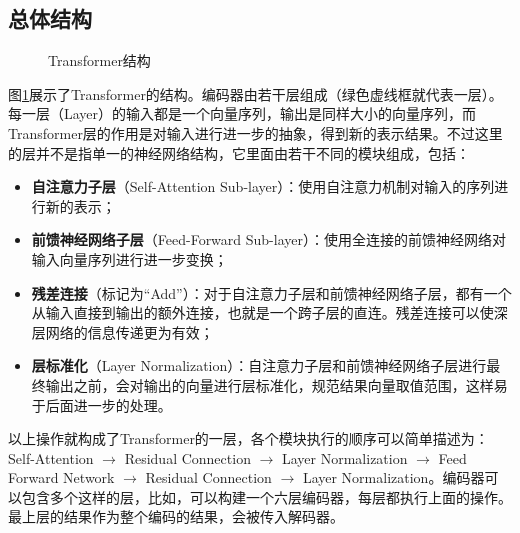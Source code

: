 \subsection{总体结构}
\begin{figure}[htp]
\centering

\caption{ Transformer结构}
\label{fig:12-4}
\end{figure}

\parinterval 图\ref{fig:12-4}展示了Transformer的结构。编码器由若干层组成（绿色虚线框就代表一层）。每一层（Layer）的输入都是一个向量序列，输出是同样大小的向量序列，而Transformer层的作用是对输入进行进一步的抽象，得到新的表示结果。不过这里的层并不是指单一的神经网络结构，它里面由若干不同的模块组成，包括：

\begin{itemize}
\vspace{0.5em}
\item {\small\sffamily\bfseries{自注意力子层}}（Self-Attention Sub-layer）：使用自注意力机制对输入的序列进行新的表示；
\vspace{0.5em}
\item {\small\sffamily\bfseries{前馈神经网络子层}}（Feed-Forward Sub-layer）：使用全连接的前馈神经网络对输入向量序列进行进一步变换；
\vspace{0.5em}
\item {\small\sffamily\bfseries{残差连接}}（标记为“Add”）：对于自注意力子层和前馈神经网络子层，都有一个从输入直接到输出的额外连接，也就是一个跨子层的直连。残差连接可以使深层网络的信息传递更为有效；
\vspace{0.5em}
\item {\small\sffamily\bfseries{层标准化}}（Layer Normalization）：自注意力子层和前馈神经网络子层进行最终输出之前，会对输出的向量进行层标准化，规范结果向量取值范围，这样易于后面进一步的处理。
\vspace{0.5em}
\end{itemize}

\parinterval 以上操作就构成了Transformer的一层，各个模块执行的顺序可以简单描述为：Self-Attention $\to$ Residual Connection $\to$ Layer Normalization $\to$ Feed Forward Network $\to$ Residual Connection $\to$ Layer Normalization。编码器可以包含多个这样的层，比如，可以构建一个六层编码器，每层都执行上面的操作。最上层的结果作为整个编码的结果，会被传入解码器。

